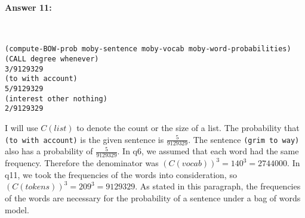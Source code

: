 \documentclass[12pt, letterpaper]{article}
\begin{document}
\paragraph{Answer 11:}~\begin{lstlisting}
(compute-BOW-prob moby-sentence moby-vocab moby-word-probabilities)
(CALL degree whenever)
3/9129329
(to with account)
5/9129329
(interest other nothing)
2/9129329
\end{lstlisting}
I will use $C(list)$ to denote the count or the size of a list. The probability that \texttt{(to with account)} is the given sentence is $\frac{5}{9129329}$. The sentence \texttt{(grim to way)} also has a probability of $\frac{5}{9129329}$. In q6, we assumed that each word had the same frequency. Therefore the denominator was $(C(vocab))^3 = 140^3 = 2744000$. In q11, we took the frequencies of the words into consideration, so $(C(tokens))^3 = 209^3 = 9129329$. As stated in this paragraph, the frequencies of the words are necessary for the probability of a sentence under a bag of words model.
\end{document}
